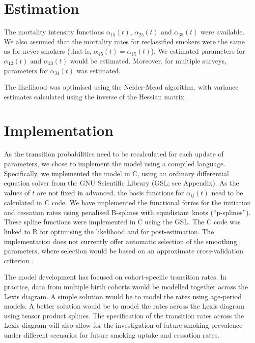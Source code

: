 \documentclass[11pt,a4paper]{article}
\begin{document}
\section{Estimation}

The mortality intensity functions $\alpha_{15}(t)$, $\alpha_{25}(t)$
and $\alpha_{35}(t)$ were available. We also assumed that the
mortality rates for reclassified smokers were the same as for never
smokers (that is, $\alpha_{45}(t)=\alpha_{15}(t)$). We estimated
parameters for $\alpha_{12}(t)$ and $\alpha_{23}(t)$ would be
estimated. Moreover, for multiple surveys, parameters for
$\alpha_{34}(t)$ was estimated.

The likelihood was optimised using the Nelder-Mead algorithm, with variance estimates calculated using the inverse of the Hessian matrix.



\section{Implementation}

As the transition probabilities need to be recalculated for each
update of parameters, we chose to implement the model using a compiled
language. Specifically, we implemented the model in C, using an
ordinary differential equation solver from the GNU Scientific Library
(GSL; see Appendix). As the values of $t$ are not fixed in advanced,
the basis functions for $\alpha_{ij}(t)$ need to be calculated in C
code.  We have implemented the functional forms for the initiation and
cessation rates using penalised B-splines with equidistant knots
(``p-splines''). These spline functions were implemented in C using
the GSL.  The C code was linked to R for optimising the likelihood and
for post-estimation.  The implementation does not currently offer
automatic selection of the smoothing parameters, where selection would
be based on an approximate cross-validation criterion
\cite[e.g.][]{joly_penalized_2002,cai_hazard_2003}.

The model development has focused on cohort-specific transition rates.
In practice, data from multiple birth cohorts would be modelled
together across the Lexis diagram. A simple solution would be to model
the rates using age-period models. A better solution would be to model
the rates across the Lexis diagram using tensor product splines.
The specification of the transition rates across the Lexis diagram
will also allow for the investigation of future smoking prevalence
under different scenarios for future smoking uptake and cessation rates.



\end{document}
